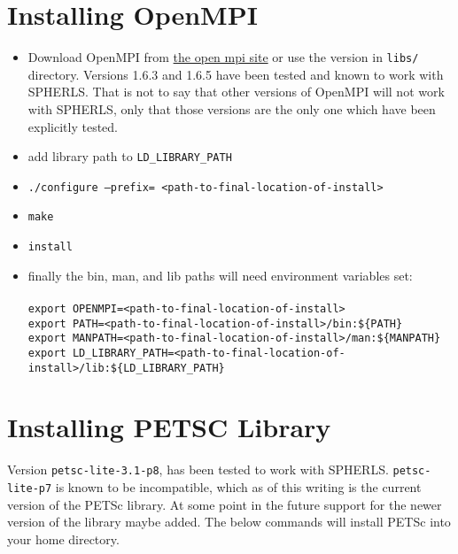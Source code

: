 \documentclass[12pt,a4paper]{book}
\begin{document}
\section{Installing OpenMPI}
\begin{itemize}
\item Download OpenMPI from \href{http://www.open-mpi.org/software/ompi/v1.6/}{the open mpi site} or use the version in {\tt libs/} directory. Versions 1.6.3 and 1.6.5 have been tested and known to work with SPHERLS. That is not to say that other versions of OpenMPI will not work with SPHERLS, only that those versions are the only one which have been explicitly tested.

\item add library path to {\tt LD\_LIBRARY\_PATH}
\item {\tt ./configure --prefix=\- <path-to-final-location-of-install>}
\item {\tt make}
\item {\tt install}
\item finally the bin, man, and lib paths will need environment variables set:\\
 \\

{\tt export OPENMPI\-=<path-to-final-location-of-install>}\\
{\tt export PATH\-=<path-to-final-location-of-install>/bin:\-\$\{PATH\}}\\
{\tt export MANPATH\-=<path-to-final-location-of-install>/man:\-\$\{MANPATH\}}\\
{\tt export LD\_LIBRARY\_PATH\-=<path-to-final-location-of-install>/lib\-:\$\{LD\_LIBRARY\_PATH\}}\\

\end{itemize}

\section{Installing PETSC Library}
Version {\tt petsc\--lite-3.1-p8}, has been tested to work with SPHERLS. {\tt petsc\--lite\--p7} is known to be incompatible, which as of this writing is the current version of the PETSc library. At some point in the future support for the newer version of the library maybe added. The below commands will install PETSc into your home directory.
\end{document}
